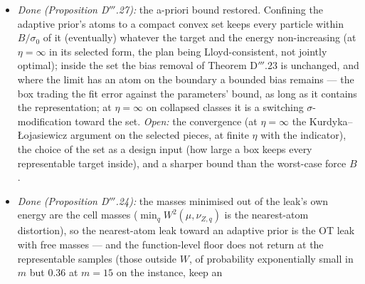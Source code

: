 \begin{enumerate}[label=\arabic*.,leftmargin=*]
\begin{itemize}
      position error being the residual filtered by
      $(\mathrm{d}/\mathrm{d}t + \lambda)^{-1}(\mathrm{d}/\mathrm{d}t + k_s)^{-1}$. On a cogging-torque servo whose
      torque four kernels cannot represent --- the loss's infimum lies at the saturation, and its local minimum
      $\vartheta^b(q)$ is Proposition D$'''$.28's regime --- the adaptive prior removes the fixed prior's floor and,
      from an engineer's misplaced model, most of its bias, at the rate of the weakest excitation; the real servo
      follows the exactly filtered prediction to 0.3\%. Noise-free, no leak at all does as well: the floors and biases
      the leaks remove there are those a fixed leak creates. \emph{Open:} the real-loop statements (Corollaries
      D$'''$.14, D$'''$.26) for second-order plants; the servo with measurement noise and disturbances, where the leaks'
      robustness is the point, against the classical baselines and a Fourier regressor of the known harmonics;
      velocity-dependent friction with the projected prior in the real loop.
    \item \emph{Done (Proposition D$'''$.27):} the a-priori bound restored. Confining the adaptive prior's atoms to a
      compact convex set keeps every particle within $B/\sigma_0$ of it (eventually) whatever the target and the
      energy non-increasing (at $\eta = \infty$ in its selected form, the plan being Lloyd-consistent, not jointly
      optimal); inside the set the bias removal of Theorem D$'''$.23 is unchanged, and where the limit has an atom on
      the boundary a bounded bias remains --- the box trading the fit error against the parameters' bound, as long as
      it contains the representation; at $\eta = \infty$ on collapsed classes it is a switching $\sigma$-modification
      toward the set. \emph{Open:} the convergence (at $\eta = \infty$ the Kurdyka--{\L}ojasiewicz argument on the
      selected pieces, at finite $\eta$ with the indicator), the choice of the set as a design input (how large a box
      keeps every representable target inside), and a sharper bound than the worst-case force $B$.
    \item \emph{Done (Proposition D$'''$.24):} the masses minimised out of the leak's own energy are the cell masses
      ($\min_qW^2(\mu,\nu_{Z,q})$ is the nearest-atom distortion), so the nearest-atom leak toward an adaptive prior
      is the OT leak with free masses --- and the function-level floor does not return at the representable samples
      (those outside $W$, of probability exponentially small in $m$ but 0.36 at $m = 15$ on the instance, keep an

\end{itemize}
\end{enumerate}
